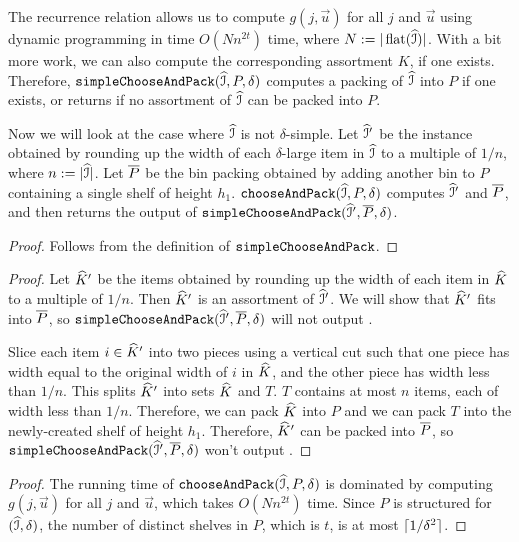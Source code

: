 The recurrence relation allows us to compute $g(j, \vec{u})$
for all $j$ and $\vec{u}$ using dynamic programming
in time $O(Nn^{2t})$ time, where $N := |\operatorname{flat}(\widehat{\mathcal{I}})|$.
With a bit more work, we can also compute the corresponding assortment $K$, if one exists.
Therefore, $\operatorname{\mathtt{simpleChooseAndPack}}(\widehat{\mathcal{I}}, P, \delta)$ computes a packing of $\widehat{\mathcal{I}}$
into $P$ if one exists, or returns \Null{} if no assortment of $\widehat{\mathcal{I}}$ can be packed into $P$.

Now we will look at the case where $\widehat{\mathcal{I}}$ is not $\delta$-simple.
Let $\widehat{\mathcal{I}}'$ be the instance obtained by rounding up the width
of each $\delta$-large item in $\widehat{\mathcal{I}}$ to a multiple of $1/n$, where $n := |\widehat{\mathcal{I}}|$.
Let $\overline{P}$ be the bin packing obtained by adding another bin to $P$
containing a single shelf of height $h_1$.
$\operatorname{\mathtt{chooseAndPack}}(\widehat{\mathcal{I}}, P, \delta)$ computes $\widehat{\mathcal{I}}'$ and $\overline{P}$,
and then returns the output of $\operatorname{\mathtt{simpleChooseAndPack}}(\widehat{\mathcal{I}}', \overline{P}, \delta)$.

\rthmCAPCorrect*
\begin{proof}
Follows from the definition of $\operatorname{\mathtt{simpleChooseAndPack}}$.
\end{proof}

\rthmCAPNotNull*
\begin{proof}
Let $\widehat{K}'$ be the items obtained by rounding up the width of each item in $\widehat{K}$
to a multiple of $1/n$. Then $\widehat{K}'$ is an assortment of $\widehat{\mathcal{I}}'$.
We will show that $\widehat{K}'$ fits into $\overline{P}$,
so $\operatorname{\mathtt{simpleChooseAndPack}}(\widehat{\mathcal{I}}', \overline{P}, \delta)$ will not output \Null.

Slice each item $i \in \widehat{K}'$ into two pieces using a vertical cut such that
one piece has width equal to the original width of $i$ in $\widehat{K}$,
and the other piece has width less than $1/n$.
This splits $\widehat{K}'$ into sets $\widehat{K}$ and $T$.
$T$ contains at most $n$ items, each of width less than $1/n$.
Therefore, we can pack $\widehat{K}$ into $P$ and we can pack $T$ into
the newly-created shelf of height $h_1$.
Therefore, $\widehat{K}'$ can be packed into $\overline{P}$,
so $\operatorname{\mathtt{simpleChooseAndPack}}(\widehat{\mathcal{I}}', \overline{P}, \delta)$ won't output \Null.
\end{proof}

\rthmCAPTime*
\begin{proof}
The running time of $\operatorname{\mathtt{chooseAndPack}}(\widehat{\mathcal{I}}, P, \delta)$
is dominated by computing $g(j, \vec{u})$ for all $j$ and $\vec{u}$,
which takes $O(Nn^{2t})$ time.
Since $P$ is structured for $(\widehat{\mathcal{I}}, \delta)$, the number of distinct shelves
in $P$, which is $t$, is at most $\lceil 1/\delta^2 \rceil$.
\end{proof}


